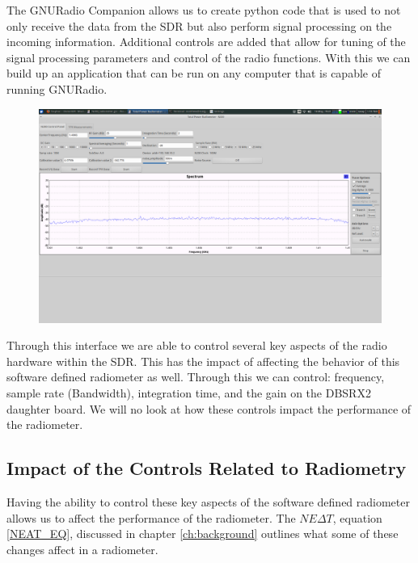 The GNURadio Companion allows us to create python code that is used to not only receive the data from the SDR but also perform signal processing on the incoming information.  Additional controls are added that allow for tuning of the signal processing parameters and control of the radio functions.  With this we can build up an application that can be run on any computer that is capable of running GNURadio.  

{\begin{figure}[h!tb] 
\centering
\includegraphics[width=17cm]{Images/radiometer_gui.png}
\label{radiometer_gui}
\end{figure}
}

Through this interface we are able to control several key aspects of the radio hardware within the SDR.  This has the impact of affecting the behavior of this software defined radiometer as well.  Through this we can control: frequency, sample rate (Bandwidth), integration time, and the gain on the DBSRX2 daughter board.  We will no look at how these controls impact the performance of the radiometer.  

\subsection{Impact of the Controls Related to Radiometry}

Having the ability to control these key aspects of the software defined radiometer allows us to affect the performance of the radiometer.  The $NE\Delta T$, equation \ref{NEAT_EQ}, discussed in chapter \ref{ch:background} outlines what some of these changes affect in a radiometer.

